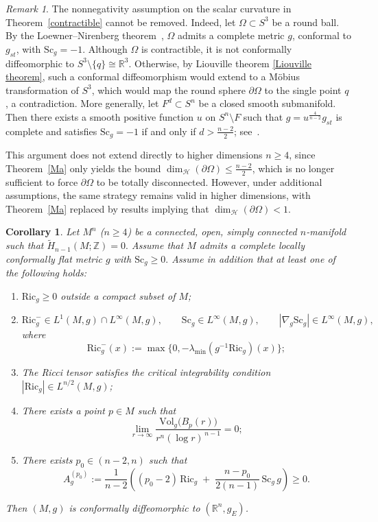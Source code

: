 \documentclass[12pt,oneside,a4paper]{article}
\theoremstyle{mytheorem}
\newtheorem{corollary}[definition]{Corollary}
\theoremstyle{remark}
\newtheorem{remark}[definition]{Remark}
\theoremstyle{definition}
\begin{document}
\begin{remark}
The nonnegativity assumption on the scalar curvature in
Theorem~\ref{contractible} cannot be removed. Indeed, let
$\Omega\subset S^3$ be a round ball. By the Loewner--Nirenberg
theorem~\cite{MR358078}, $\Omega$ admits a complete metric $g$, conformal
to $g_{st}$, with $\mathrm{Sc}_g=-1$. Although $\Omega$ is contractible,
it is not conformally diffeomorphic to
$S^3\setminus\{q\}\cong\mathbb R^3$. Otherwise, by Liouville theorem \ref{Liouville theorem},
such a conformal diffeomorphism would extend to a M\"obius transformation
of $S^3$, which would map the round sphere $\partial\Omega$ to the single
point $q$, a contradiction. More generally, let \(F^d\subset S^n\) be a closed smooth submanifold. Then
there exists a smooth positive function \(u\) on \(S^n\setminus F\) such that
$g=u^{\frac{4}{n-2}}g_{st}$
is complete and satisfies \(\mathrm{Sc}_g=-1\) if and only if
$d>\frac{n-2}{2}$; see~\cite{zbMATH04052477}.
\end{remark}



This argument does not extend directly to higher dimensions $n \ge 4$, since Theorem~\ref{Ma} only yields the bound $\dim_{\mathcal{H}}(\partial \Omega) \le \frac{n-2}{2}$, which is no longer sufficient to force $\partial \Omega$ to be totally disconnected. However, under additional assumptions, the same strategy remains valid in higher dimensions, with Theorem~\ref{Ma} replaced by results implying that $\dim_{\mathcal{H}}(\partial \Omega) < 1$.


\begin{corollary}\label{Contractible for}
Let \(M^n\) (\(n\ge 4\)) be a connected, open, simply connected \(n\)-manifold
such that $\widetilde H_{n-1}(M;\mathbb Z)=0.$
Assume that \(M\) admits a complete locally conformally flat metric \(g\) with
$\mathrm{Sc}_g \ge 0.$
Assume in addition that at least one of the following holds:
\begin{enumerate}
\item [(i)] \(\mathrm{Ric}_g \ge 0\) outside a compact subset of \(M\);
\item [(ii)]
\[
\mathrm{Ric}_g^- \in L^1(M,g) \cap L^\infty(M,g),\qquad
\mathrm{Sc}_g \in L^\infty(M,g),\qquad
|\nabla_g \mathrm{Sc}_g| \in L^\infty(M,g),
\]
where
\[
\mathrm{Ric}_g^-(x):=
\max\bigl\{0,-\lambda_{\min}(g^{-1}\mathrm{Ric}_g)(x)\bigr\};
\]
\item [(iii)] The Ricci tensor satisfies the critical integrability condition $|\mathrm{Ric}_g| \in L^{n/2}(M,g)$;

\item [(iv)] There exists a point $p \in M$ such that
\[
\lim_{r \to \infty} \frac{\mathrm{Vol}_g\bigl(B_p(r)\bigr)}{r^{n} (\log r)^{\,n-1}} = 0;
\]
\item [(v)] There exists \( p_0 \in (n-2,n) \) such that
\[
A_g^{(p_0)} := \frac{1}{n-2} \left( (p_0-2)\,\mathrm{Ric}_g \;+\; \frac{n-p_0}{2(n-1)}\,\mathrm{Sc}_g\, g \right) \ge 0.
\]

\end{enumerate}
Then \((M,g)\) is conformally diffeomorphic to \((\mathbb R^n,g_E)\).
\end{corollary}
\end{document}
